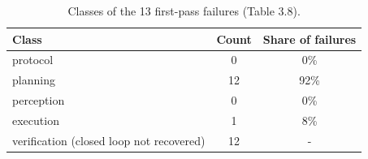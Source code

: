 \begin{table}[htbp]
\centering
\caption{Classes of the 13 first-pass failures (Table 3.8).}
\label{tab:rdt_attribution}
\small
\begin{tabular}{lcc}
\toprule
Class & Count & Share of failures \\
\midrule
protocol & 0 & 0\% \\
planning & 12 & 92\% \\
perception & 0 & 0\% \\
execution & 1 & 8\% \\
verification (closed loop not recovered) & 12 & - \\
\bottomrule
\end{tabular}
\end{table}
